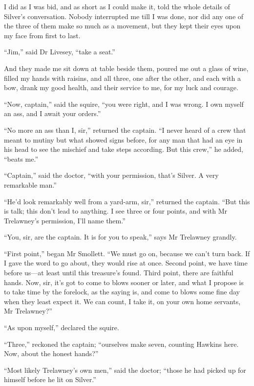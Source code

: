 I did as I was bid, and as short as I could make it, told the whole details of Silver’s conversation. Nobody interrupted me till I was done, nor did any one of the three of them make so much as a movement, but they kept their eyes upon my face from first to last.

\enquote{Jim,} said Dr Livesey, \enquote{take a seat.}

And they made me sit down at table beside them, poured me out a glass of wine, filled my hands with raisins, and all three, one after the other, and each with a bow, drank my good health, and their service to me, for my luck and courage.

\enquote{Now, captain,} said the squire, \enquote{you were right, and I was wrong. I own myself an ass, and I await your orders.}

\enquote{No more an ass than I, sir,} returned the captain. \enquote{I never heard of a crew that meant to mutiny but what showed signs before, for any man that had an eye in his head to see the mischief and take steps according. But this crew,} he added, \enquote{beats me.}

\enquote{Captain,} said the doctor, \enquote{with your permission, that’s Silver. A very remarkable man.}

\enquote{He’d look remarkably well from a yard-arm, sir,} returned the captain. \enquote{But this is talk; this don’t lead to anything. I see three or four points, and with Mr Trelawney’s permission, I’ll name them.}

\enquote{You, sir, are the captain. It is for you to speak,} says Mr Trelawney grandly.

\enquote{First point,} began Mr Smollett. \enquote{We must go on, because we can’t turn back. If I gave the word to go about, they would rise at once. Second point, we have time before us---at least until this treasure’s found. Third point, there are faithful hands. Now, sir, it’s got to come to blows sooner or later, and what I propose is to take time by the forelock, as the saying is, and come to blows some fine day when they least expect it. We can count, I take it, on your own home servants, Mr Trelawney?}

\enquote{As upon myself,} declared the squire.

\enquote{Three,} reckoned the captain; \enquote{ourselves make seven, counting Hawkins here. Now, about the honest hands?}

\enquote{Most likely Trelawney’s own men,} said the doctor; \enquote{those he had picked up for himself before he lit on Silver.}

